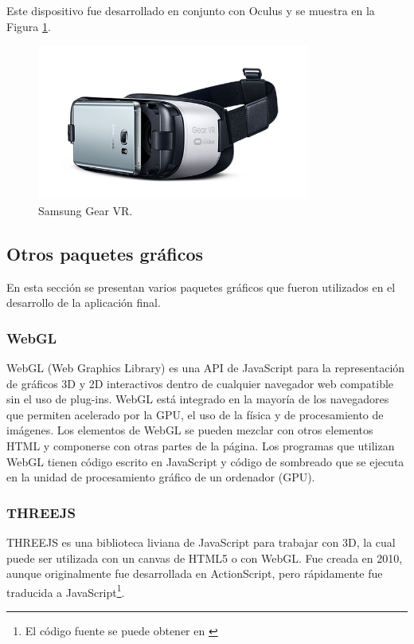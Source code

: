 \documentclass[12pt]{article}
\begin{document}
Este dispositivo fue desarrollado en conjunto con Oculus\cite{samsungvr} y se muestra en la Figura \ref{sgvr}.
\begin{figure}[h!]
\includegraphics[width=0.8\textwidth,center]{samsungvr.png}
\caption{Samsung Gear VR.}
\label{sgvr}
\end{figure}

\subsection{Otros paquetes gráficos}
\noindent En esta sección se presentan varios paquetes gráficos que fueron utilizados en el desarrollo de la aplicación final.
\subsubsection{WebGL}
\noindent WebGL (Web Graphics Library) es una API de JavaScript para la representación  de gráficos 3D y 2D  interactivos dentro de cualquier navegador web compatible sin el uso de plug-ins. WebGL está integrado en la mayoría de los navegadores que permiten acelerado por la GPU, el uso de la física y de procesamiento de imágenes. Los elementos de WebGL se pueden mezclar con otros elementos HTML y componerse con otras partes de la página. Los programas que utilizan WebGL tienen código escrito en JavaScript y  código de sombreado que se ejecuta en la unidad de procesamiento gráfico de un ordenador (GPU). 
\subsubsection{THREEJS}
\noindent THREEJS es una biblioteca liviana\cite{three} de JavaScript para trabajar con 3D, la cual puede ser utilizada con un canvas de HTML5 o con WebGL. Fue creada en 2010, aunque originalmente fue desarrollada en ActionScript, pero rápidamente fue traducida a JavaScript\footnote{El código fuente se puede obtener en \cite{codigothree}}.
\end{document}
